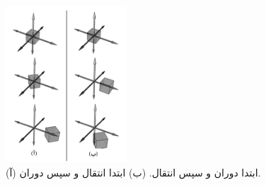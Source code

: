{\begin{spacing}{1.5}
        \begin{figure}[H]
            \centering
            \setlength{\belowcaptionskip}{-10pt}
            \includegraphics[width=0.4\textwidth]{Images/4/3/4.Session.1.3.9}
            \caption {(آ) ابتدا دوران و سپس انتقال. (ب) ابتدا انتقال و سپس دوران.}
            \label{fig:4.Session.1.3.9}
        \end{figure}
    \end{spacing}
}


